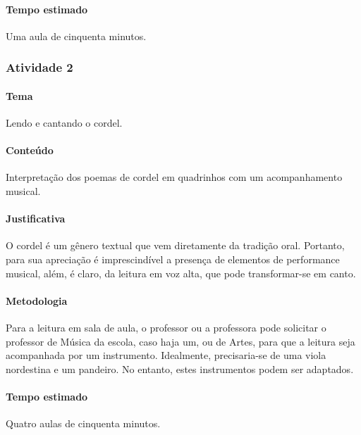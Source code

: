 \documentclass[11pt]{extarticle}
\begin{document}
\paragraph{Tempo estimado} Uma aula de cinquenta minutos.




\subsubsection{Atividade 2}

\paragraph{Tema} Lendo e cantando o cordel. 


\paragraph{Conteúdo} Interpretação dos poemas de cordel em quadrinhos com um
acompanhamento musical.

\paragraph{Justificativa} O cordel é um gênero textual que vem diretamente da
tradição oral. Portanto, para sua apreciação é imprescindível 
a presença de elementos de performance musical, além, é claro, da leitura
em voz alta, que pode transformar-se em canto.

\paragraph{Metodologia} Para a leitura em sala de aula, o professor ou a professora pode solicitar o
professor de Música da escola, caso haja um, ou de Artes, para que a leitura
seja acompanhada por um instrumento. Idealmente, precisaria-se de uma viola nordestina 
e um pandeiro. No entanto, estes instrumentos podem ser adaptados. 


\paragraph{Tempo estimado} Quatro aulas de cinquenta minutos.
\end{document}
